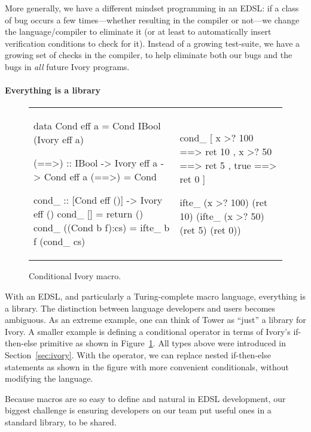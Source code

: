More generally, we have a different mindset programming in an EDSL: if a class
of bug occurs a few times---whether resulting in the compiler or not---we change
the language/compiler to eliminate it (or at least to automatically insert
verification conditions to check for it).  Instead of a growing test-suite, we
have a growing set of checks in the compiler, to help eliminate both our bugs
and the bugs in \emph{all} future Ivory programs.

\paragraph{Everything is a library}

\begin{figure}
  \begin{tabular}{p{}|p{}}
    \begin{smcode}
data Cond eff a =
  Cond IBool (Ivory eff a)

(==>) :: IBool -> Ivory eff a
      -> Cond eff a
(==>) = Cond

cond_ :: [Cond eff ()]
      -> Ivory eff ()
cond_ [] = return ()
cond_ ((Cond b f):cs) =
  ifte_ b f (cond_ cs)
    \end{smcode} &
    \begin{smcode}
cond_
  [ x >? 100 ==> ret 10
  , x >? 50  ==> ret 5
  , true     ==> ret 0 ]

ifte_ (x >? 100)
 (ret 10)
 (ifte_ (x >? 50)
   (ret 5)
     (ret 0))
    \end{smcode}
  \end{tabular}
  \caption{Conditional Ivory macro.}
  \label{fig:ivory-cond}
\end{figure}

With an EDSL, and particularly a Turing-complete macro language, everything is a
library.  The distinction between language developers and users becomes
ambiguous.  As an extreme example, one can think of Tower as ``just'' a library
for Ivory.  A smaller example is defining a conditional operator in terms of
Ivory's if-then-else primitive as shown in Figure~\ref{fig:ivory-cond}.  All
types above were introduced in Section~\ref{sec:ivory}.  With the 
operator, we can replace nested if-then-else statements as shown in the figure
with more convenient conditionals, without modifying the language.

Because macros are so easy to define and natural in EDSL development, our
biggest challenge is ensuring developers on our team put useful ones in a
standard library, to be shared.

